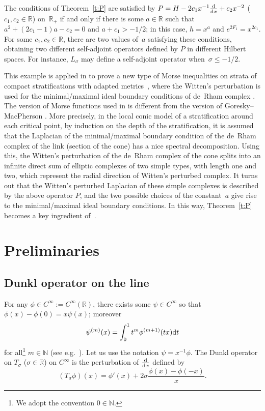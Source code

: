 \documentclass[pdftex]{sigma}
\newcommand{\R}{\mathbb{R}}
\newcommand{\N}{\mathbb{N}}
\newcommand{\Cinf}{C^\infty}
\begin{document}
The conditions of Theorem~\ref{t:P} are satisf\/ied by $P=H-2c_1x^{-1}\frac{{\rm d}}{{\rm d}x}+c_2x^{-2}$ ($c_1,c_2\in\R$) on~$\R_+$ if and only if there is some $a\in\R$ such that $a^2+(2c_1-1)a-c_2=0$ and $a+c_1>-1/2$; in this case, $h=x^a$ and $e^{2F_1}=x^{2c_1}$. For some $c_1,c_2\in\R$, there are two values of~$a$ satisfying these conditions, obtaining two dif\/ferent self-adjoint operators def\/ined by $P$ in dif\/ferent Hilbert spaces. For instance, $L_\sigma$ may def\/ine a self-adjoint operator when~$\sigma\le-1/2$.

This example is applied in \cite{AlvCalaza:Witten} to prove a new type of Morse inequalities on strata of compact stratif\/ications \cite{Mather1970,Thom1969,Verona1984} with adapted metrics~\cite{BrasseletHectorSaralegi1992, Nagase1983,Nagase1986}, where the Witten's perturbation \cite{Witten1982} is used for the minimal/maximal ideal boundary conditions of de~Rham complex \cite{BruningLesch1992, Cheeger1980,Cheeger1983}. The version of Morse functions used in \cite{AlvCalaza:Witten} is dif\/ferent from the version of Goresky--MacPherson \cite{GoreskyMacPherson1983:Morse}. More precisely, in the local conic model of a stratif\/ication around each critical point, by induction on the depth of the stratif\/ication, it is assumed that the Laplacian of the minimal/maximal boundary condition of the de~Rham complex of the link (section of the cone) has a nice spectral decomposition. Using this, the Witten's perturbation of the de~Rham complex of the cone splits into an inf\/inite direct sum of elliptic complexes of two simple types, with length one and two, which represent the radial direction of Witten's perturbed complex. It turns out that the Witten's perturbed Laplacian of these simple complexes is described by the above operator $P$, and the two possible choices of the constant~$a$ give rise to the minimal/maximal ideal boundary conditions. In this way, Theorem~\ref{t:P} becomes a key ingredient of~\cite{AlvCalaza:Witten}.

\section{Preliminaries}\label{s:preliminaries}

\subsection{Dunkl operator on the line}\label{ss:D sigma}

For any $\phi\in\Cinf:=\Cinf(\R)$, there exists some $\psi\in\Cinf$ so that $\phi(x)-\phi(0)=x\psi(x)$; moreover
  \begin{gather}\label{psi (m)(x)}
    \psi^{(m)}(x)=\int_0^1t^m\phi^{(m+1)}(tx){\rm d}t
  \end{gather}
for all\footnote{We adopt the convention $0\in\N$.} $m\in\N$ (see e.g.~\cite[Theorem~1.1.9]{Hormander1990-I}). Let us use the notation $\psi=x^{-1}\phi$. The Dunkl operator on $T_\sigma$ ($\sigma\in\R$) on $\Cinf$ is the perturbation of $\frac{{\rm d}}{{\rm d}x}$ def\/ined by
  \[
    (T_\sigma\phi)(x)=\phi'(x)+2\sigma \frac{\phi(x)-\phi(-x)}{x} .
  \]
\end{document}
